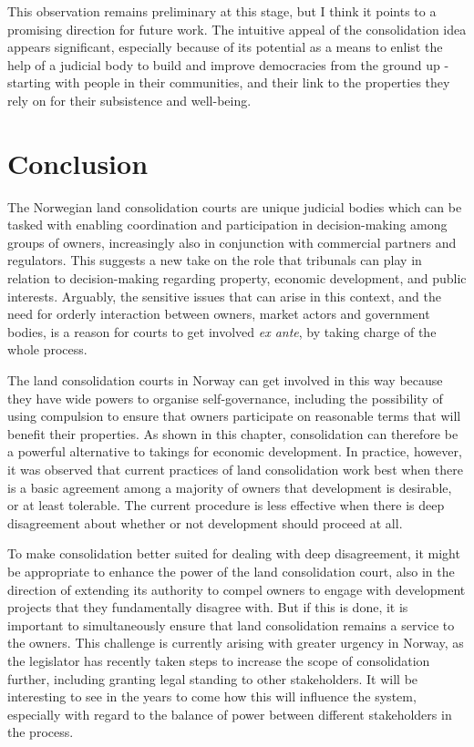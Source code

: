 This observation remains preliminary at this stage, but I think it points to a promising direction for future work. The intuitive appeal of the consolidation idea appears significant, especially because of its potential as a means to enlist the help of a judicial body to build and improve democracies from the ground up - starting with people in their communities, and their link to the properties they rely on for their subsistence and well-being.

\section{Conclusion}\label{sec:6:6}

The Norwegian land consolidation courts are unique judicial bodies which can be tasked with enabling coordination and participation in decision-making among groups of owners, increasingly also in conjunction with commercial partners and regulators. This suggests a new take on the role that tribunals can play in relation to decision-making regarding property, economic development, and public interests. Arguably, the sensitive issues that can arise in this context, and the need for orderly interaction between owners, market actors and government bodies, is a reason for courts to get involved {\it ex ante}, by taking charge of the whole process.

The land consolidation courts in Norway can get involved in this way because they have wide powers to organise self-governance, including the possibility of using compulsion to ensure that owners participate on reasonable terms that will benefit their properties. As shown in this chapter, consolidation can therefore be a powerful alternative to takings for economic development. In practice, however, it was observed that current practices of land consolidation work best when there is a basic agreement among a majority of owners that development is desirable, or at least tolerable. The current procedure is less effective when there is deep disagreement about whether or not development should proceed at all.

To make consolidation better suited for dealing with deep disagreement, it might be appropriate to enhance the power of the land consolidation court, also in the direction of extending its authority to compel owners to engage with development projects that they fundamentally disagree with. But if this is done, it is important to simultaneously ensure that land consolidation remains a service to the owners. This challenge is currently arising with greater urgency in Norway, as the legislator has recently taken steps to increase the scope of consolidation further, including granting legal standing to other stakeholders. It will be interesting to see in the years to come how this will influence the system, especially with regard to the balance of power between different stakeholders in the process.

